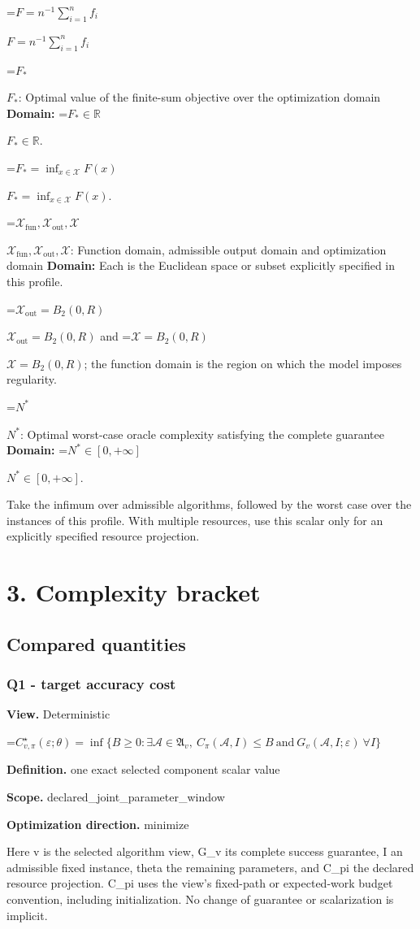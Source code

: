 \documentclass[10pt,a4paper]{article}
\newcommand{\AtlasMath}[1]{\par\begingroup\centering\setbox0=\hbox{$\displaystyle #1$}\ifdim\wd0>1.4\linewidth\typeout{ATLAS WIDE FORMULA: \the\wd0}\fi\ifdim\wd0>\linewidth\resizebox{\linewidth}{!}{\box0}\else\box0\fi\par\endgroup}
\newcommand{\AtlasInlineMath}[1]{\begingroup\setbox0=\hbox{$#1$}\ifdim\wd0>.4\linewidth\endgroup\AtlasMath{#1}\else\endgroup$#1$\fi}
\begin{document}
\AtlasInlineMath{F=n^{-1}\sum_{i=1}^n f_i}

\AtlasInlineMath{F_*}: Optimal value of the finite-sum objective over the optimization domain \textbf{Domain:} \AtlasInlineMath{F_*\in\mathbb{R}}.

\AtlasInlineMath{F_*=\inf_{x\in\mathcal{X}}F(x)}.

\AtlasInlineMath{\mathcal{X}_{\mathrm{fun}},\mathcal{X}_{\mathrm{out}},\mathcal{X}}: Function domain, admissible output domain and optimization domain \textbf{Domain:} Each is the Euclidean space or subset explicitly specified in this profile.

\AtlasInlineMath{\mathcal{X}_{\mathrm{out}}=B_2(0,R)} and \AtlasInlineMath{\mathcal{X}=B_2(0,R)}; the function domain is the region on which the model imposes regularity.

\AtlasInlineMath{N^*}: Optimal worst-case oracle complexity satisfying the complete guarantee \textbf{Domain:} \AtlasInlineMath{N^*\in[0,+\infty]}.

Take the infimum over admissible algorithms, followed by the worst case over the instances of this profile. With multiple resources, use this scalar only for an explicitly specified resource projection.

\section{3. Complexity bracket}
\subsection{Compared quantities}
\subsubsection{Q1 - target accuracy cost}
\textbf{View.} Deterministic

\AtlasMath{C^\star_{v,\pi}(\varepsilon;\theta)=\inf\{B\ge0:\exists\mathcal A\in\mathfrak A_v,\ C_\pi(\mathcal A,I)\le B\ \text{and}\ G_v(\mathcal A,I;\varepsilon)\ \forall I\}}
\textbf{Definition.} one exact selected component scalar value

\textbf{Scope.} declared\_joint\_parameter\_window

\textbf{Optimization direction.} minimize

Here v is the selected algorithm view, G\_v its complete success guarantee, I an admissible fixed instance, theta the remaining parameters, and C\_pi the declared resource projection. C\_pi uses the view's fixed-path or expected-work budget convention, including initialization. No change of guarantee or scalarization is implicit.
\end{document}
